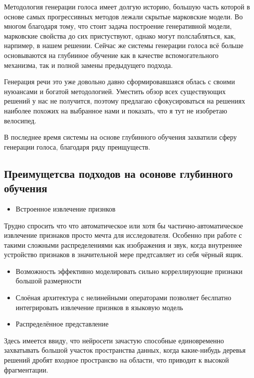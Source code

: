 \documentclass[../diploma.tex]{subfiles}
\begin{document}
\label{sec:existing_solutions}
   

Методология генерации голоса имеет долгую историю, большую часть которой в основе самых прогрессивных методов лежали скрытые марковские модели.
Во многом благодаря тому, что стоит задача построение генеративной модели, марковские свойства до сих пристуствуют, однако могут полслабляться, как, нарпимер, в нашем решении. 
Сейчас же системы генерации голоса всё больше основываются на глубииное обучение как в качестве вспомогательного механизма, так и полной замены предыдущего подхода.

Генерация речи это уже довольно давно сформировавшаяся облась с своими нуюансами и богатой методологией.
Уместить обзор всех существующих решений у нас не получится, поэтому предлагаю сфокусироваться на решениях наиболее похожих на выбранное нами и показать, что я тут не изобретаю велосипед.

В последнее время системы на основе глубинного обучения захватили сферу генерации голоса, благодаря ряду преищуществ.

\subsection{Преимущетсва подходов на осонове глубинного обучения}

\begin{itemize}
    \item Встроенное извлечение признков
\end{itemize}    

Трудно спросить что что автоматическое или хотя бы частично-автоматическое извлечение признаков просто мечта для исследователя. Особенно при работе с такими сложными распределениями как изображения и звук, когда внутреннее устройство признаков в значительной мере предтсавляет из себя чёрный ящик.

\begin{itemize}
    \begin{itemize}
        \item Возможность эффективно моделировать сильно корреллирующие признаки большой размерности 
        \item Слоёная архитектура с нелинейными операторами позволяет беслпатно интегрировать извлечение признков в языковую модель
    \end{itemize}    
\end{itemize}

\begin{itemize}[resume]
    \item Распределённое представление
\end{itemize}    
    Здесь имеется ввиду, что нейросети зачастую способные единовременно захватывать большой участок пространства данных, когда какие-нибудь деревья решений дробят входное пространсво на области, что приводит к высокой фрагментации. 
\end{document}

